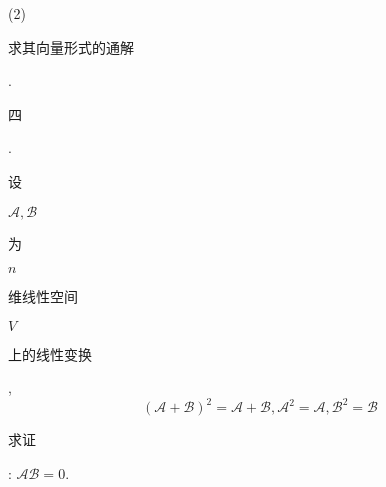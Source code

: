 \documentclass[10pt]{article}
\begin{document}
(2) \begin{CJK}{UTF8}{mj}求其向量形式的通解\end{CJK}.

\begin{CJK}{UTF8}{mj}四\end{CJK}. \begin{CJK}{UTF8}{mj}设\end{CJK} $\mathscr{A}, \mathscr{B}$ \begin{CJK}{UTF8}{mj}为\end{CJK} $n$ \begin{CJK}{UTF8}{mj}维线性空间\end{CJK} $V$ \begin{CJK}{UTF8}{mj}上的线性变换\end{CJK},
$$
(\mathscr{A}+\mathscr{B})^{2}=\mathscr{A}+\mathscr{B}, \mathscr{A}^{2}=\mathscr{A}, \mathscr{B}^{2}=\mathscr{B}
$$
\begin{CJK}{UTF8}{mj}求证\end{CJK}: $\mathscr{A} \mathscr{B}=0$.
\end{document}
